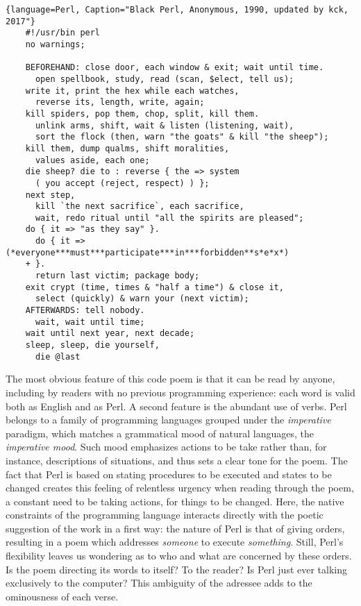 \linespread{1.00}\selectfont
\begin{lstlisting}{language=Perl, Caption="Black Perl, Anonymous, 1990, updated by kck, 2017"}
    #!/usr/bin perl
    no warnings;
    
    BEFOREHAND: close door, each window & exit; wait until time.
      open spellbook, study, read (scan, $elect, tell us);
    write it, print the hex while each watches,
      reverse its, length, write, again;
    kill spiders, pop them, chop, split, kill them.
      unlink arms, shift, wait & listen (listening, wait),
      sort the flock (then, warn "the goats" & kill "the sheep");
    kill them, dump qualms, shift moralities,
      values aside, each one;
    die sheep? die to : reverse { the => system
      ( you accept (reject, respect) ) };
    next step,
      kill `the next sacrifice`, each sacrifice,
      wait, redo ritual until "all the spirits are pleased";
    do { it => "as they say" }.
      do { it => (*everyone***must***participate***in***forbidden**s*e*x*)
    + }.
      return last victim; package body;
    exit crypt (time, times & "half a time") & close it,
      select (quickly) & warn your (next victim);
    AFTERWARDS: tell nobody.
      wait, wait until time;
    wait until next year, next decade;
    sleep, sleep, die yourself,
      die @last 
\end{lstlisting}
\linespread{1.50}\selectfont
\normalfont

The most obvious feature of this code poem is that it can be read by anyone, including by readers with no previous programming experience: each word is valid both as English and as Perl. A second feature is the abundant use of verbs. Perl belongs to a family of programming languages grouped under the \emph{imperative} paradigm, which matches a grammatical mood of natural languages, the \emph{imperative mood}. Such mood emphasizes actions to be take rather than, for instance, descriptions of situations, and thus sets a clear tone for the poem. The fact that Perl is based on stating procedures to be executed and states to be changed creates this feeling of relentless urgency when reading through the poem, a constant need to be taking actions, for things to be changed. Here, the native constraints of the programming language interacts directly with the poetic suggestion of the work in a first way: the nature of Perl is that of giving orders, resulting in a poem which addresses \emph{someone} to execute \emph{something}. Still, Perl's flexibility leaves us wondering as to who and what are concerned by these orders. Is the poem directing its words to itself? To the reader? Is Perl just ever talking exclusively to the computer? This ambiguity of the adressee adds to the ominousness of each verse.

